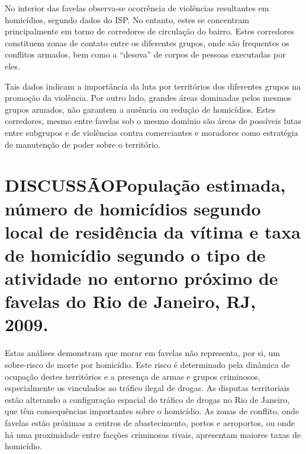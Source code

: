 \documentclass{article}
\begin{document}
No interior das favelas observa-se ocorrência de violências resultantes em
homicídios, segundo dados do ISP. No entanto, estes se concentram principalmente
em torno de corredores de circulação do bairro. Estes corredores constituem
zonas de contato entre os diferentes grupos, onde são frequentes os conflitos
armados, bem como a “desova” de corpos de pessoas executadas por eles.

Tais dados indicam a importância da luta por territórios dos diferentes grupos
na promoção da violência. Por outro lado, grandes áreas dominadas pelos mesmos
grupos armados, não garantem a ausência ou redução de homicídios. Estes
corredores, mesmo entre favelas sob o mesmo domínio são áreas de possíveis lutas
entre subgrupos e de violências contra comerciantes e moradores como estratégia
de manutenção de poder sobre o território.

\section{DISCUSSÃOPopulação estimada, número de homicídios segundo local de
residência da vítima e taxa de homicídio segundo o tipo de atividade no entorno
próximo de favelas do Rio de Janeiro, RJ, 2009.}

Estas análises demonstram que morar em favelas não representa, por si, um
sobre-risco de morte por homicídio. Este risco é determinado pela dinâmica de
ocupação destes territórios e a presença de armas e grupos criminosos,
especialmente os vinculados ao tráfico ilegal de drogas. As disputas
territoriais estão alterando a configuração espacial do tráfico de drogas no Rio
de Janeiro, que têm consequências importantes sobre o homicídio. As zonas de
conflito, onde favelas estão próximas a centros de abastecimento, portos e
aeroportos, ou onde há uma proximidade entre facções criminosas rivais,
apresentam maiores taxas de homicídio.
\end{document}

